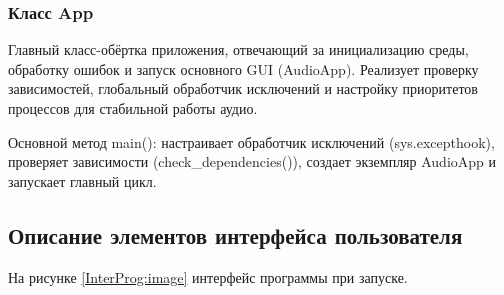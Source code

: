 \subsubsection{Класс App}

Главный класс-обёртка приложения, отвечающий за инициализацию среды, обработку ошибок и запуск основного GUI (AudioApp). Реализует проверку зависимостей, глобальный обработчик исключений и настройку приоритетов процессов для стабильной работы аудио.

Основной метод main(): настраивает обработчик исключений (sys.excepthook), проверяет зависимости (check\_dependencies()), создает экземпляр AudioApp и запускает главный цикл.

\subsection{Описание элементов интерфейса пользователя}

На рисунке \ref{InterProg:image} интерфейс программы при запуске.

